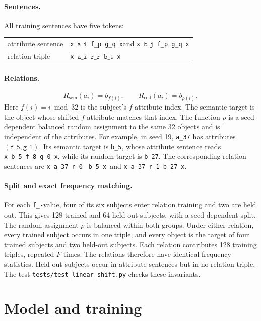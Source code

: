 \documentclass[11pt]{article}
\newcommand{\sep}{\texttt{x}}
\newcommand{\subj}[1]{\texttt{a\_#1}}
\newcommand{\obj}[1]{\texttt{b\_#1}}
\newcommand{\rel}[1]{\texttt{r\_#1}}
\newcommand{\fatt}[1]{\texttt{f\_#1}}
\newcommand{\gatt}[1]{\texttt{g\_#1}}
\newcommand{\Rsem}{R_{\mathrm{sem}}}
\newcommand{\Rrnd}{R_{\mathrm{rnd}}}
\begin{document}
\paragraph{Sentences.}
All training sentences have five tokens:
\begin{center}
\begin{tabular}{ll}
attribute sentence & \sep\ $\subj{i}$\ \fatt{p}\ \gatt{q}\ \sep \quad and \quad \sep\ $\obj{j}$\ \fatt{p}\ \gatt{q}\ \sep\\
relation triple & \sep\ $\subj{i}$\ $\rel{r}$\ $\obj{t}$\ \sep
\end{tabular}
\end{center}

\paragraph{Relations.}
\[
\Rsem(a_i) = b_{f(i)}, \qquad \Rrnd(a_i) = b_{\rho(i)},
\]
Here $f(i) = i \bmod 32$ is the subject's $f$-attribute index.  The semantic
target is the object whose shifted $f$-attribute matches that index.  The function
$\rho$ is a seed-dependent balanced random assignment to the same 32 objects and
is independent of the attributes.  For example, in seed 19, \subj{37} has
attributes $(\fatt{5}, \gatt{1})$.  Its semantic target is \obj{5}, whose attribute
sentence reads \sep\ \obj{5}\ \fatt{8}\ \gatt{0}\ \sep, while its random target
is \obj{27}.  The corresponding relation sentences are \sep\ \subj{37}\ \rel{0}
\ \obj{5}\ \sep\ and \sep\ \subj{37}\ \rel{1}\ \obj{27}\ \sep.

\paragraph{Split and exact frequency matching.}
For each \fatt-value, four of its six subjects enter relation training and two are
held out.  This gives 128 trained and 64 held-out subjects, with a seed-dependent
split.  The random assignment $\rho$ is balanced within both groups.  Under either
relation, every trained subject occurs in one triple, and every object is the target
of four trained subjects and two held-out subjects.  Each relation contributes 128
training triples, repeated $F$ times.  The relations therefore have identical
frequency statistics.  Held-out subjects occur in attribute sentences but in no
relation triple.  The test \texttt{tests/test\_linear\_shift.py} checks these
invariants.

\section{Model and training}
\end{document}
